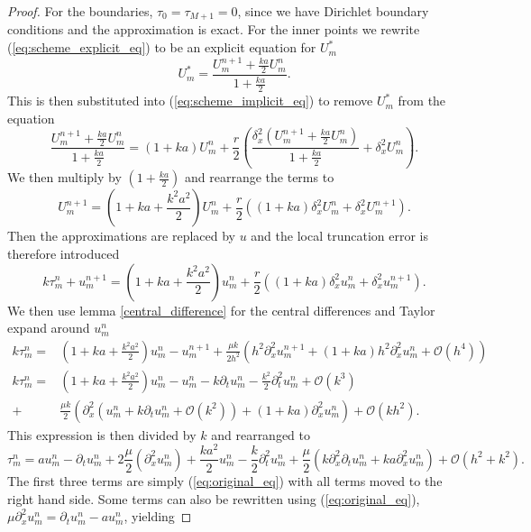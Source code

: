 \begin{proof}
    For the boundaries, $\tau_0=\tau_{M+1}= 0$, since we have Dirichlet boundary conditions and the approximation is exact.
    For the inner points we rewrite (\ref{eq:scheme_explicit_eq}) to be an explicit equation for $U_m^*$
    $$ U_{m}^{*}= \frac{U_{m}^{n+1}+\frac{ka}{2}U_{m}^{n}}{1+\frac{ka}{2}}.$$
    This is then substituted into (\ref{eq:scheme_implicit_eq}) to remove $U_{m}^{*}$ from the equation
    $$\frac{U_{m}^{n+1}+\frac{ka}{2}U_{m}^{n}}{1+\frac{ka}{2}} = (1+ka)U_{m}^{n}+\frac{r}{2}\left( \frac{\delta_x^2(U_{m}^{n+1}+\frac{ka}{2}U_{m}^{n})}{1+\frac{ka}{2}}  + \delta_x^2 U_{m}^{n}\right).$$
    We then multiply by $(1+\frac{ka}{2})$ and rearrange the terms to
    $$ U_{m}^{n+1}=(1+ ka + \frac{k^2a^2}{2})U_{m}^{n} + \frac{r}{2}\left((1+ka)\delta_x^2U_{m}^{n} +\delta_x^2U_{m}^{n+1}\right).$$
    Then the approximations are replaced by $u$ and the local truncation error is therefore introduced
    $$ k\tau_m^n + u_{m}^{n+1} = (1+ ka + \frac{k^2a^2}{2})u_{m}^{n} + \frac{r}{2}\left((1+ka)\delta_x^2u_{m}^{n} +\delta_x^2u_{m}^{n+1}\right).$$
    We then use lemma \ref{central_difference} for the central differences and Taylor expand around $u_{m}^{n}$
    \begin{align*}
        k \tau_m^n =& \left( 1 + ka +\frac{k^2a^2}{2}\right)u_{m}^{n} - u_{m}^{n+1}+\frac{\mu k}{2h^2} \left(h^2\partial_x^2 u_{m}^{n+1} + \left( 1+ka \right) h^2 \partial_x^2u_{m}^{n} + \mathcal{O}(h^4)\right) \\
        k \tau_m^n =& \left( 1 + ka + \frac{k^2a^2}{2}\right)u_{m}^{n} - u_{m}^{n} - k \partial_tu_{m}^{n} - \frac{k^2}{2} \partial_t^2 u_{m}^{n} + \mathcal{O}(k^3)  \\
        +& \frac{\mu k}{2}\left( \partial_x^2 \left( u_{m}^{n} + k \partial_t u_{m}^{n} + \mathcal{O}(k^2)\right) + \left( 1 + ka\right) \partial_x^2  u_{m}^{n} \right) + \mathcal{O}(kh^2).
    \end{align*}
    This expression is then divided by $k$ and rearranged to 
    $$\tau_m^n = a u_{m}^{n} - \partial_tu_{m}^{n} + 2 \frac{\mu}{2}\left( \partial_x^2 u_{m}^{n}\right) +  \frac{ka^2}{2}u_{m}^{n}  - \frac{k}{2} \partial_t^2 u_{m}^{n} + \frac{\mu }{2}\left( k \partial_x^2 \partial_t u_{m}^{n}  + ka \partial_x^2  u_{m}^{n} \right) + \mathcal{O}(h^2 + k^2).$$
    The first three terms are simply (\ref{eq:original_eq}) with all terms moved to the right hand side. Some terms can also be rewritten using (\ref{eq:original_eq}), $\mu \partial_x^2u_{m}^{n} = \partial_t u_{m}^{n} - au_{m}^{n}$, yielding

\end{proof}
